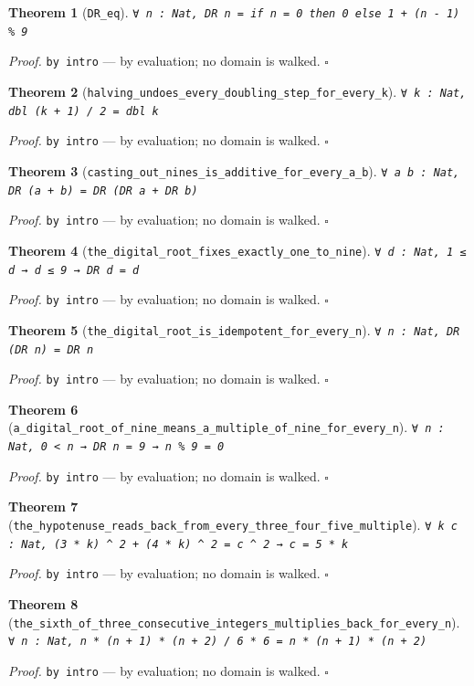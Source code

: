 \documentclass[11pt]{article}
\newtheorem{theorem}{Theorem}[section]
\begin{document}
\begin{theorem}[\texttt{DR\_eq}]
\texttt{∀ n : Nat, DR n = if n = 0 then 0 else 1 + (n - 1) \% 9}
\end{theorem}
\noindent\emph{Proof.} \texttt{by
  intro} --- by evaluation; no domain is walked. \hfill$\square$

\begin{theorem}[\texttt{halving\_undoes\_every\_doubling\_step\_for\_every\_k}]
\texttt{∀ k : Nat, dbl (k + 1) / 2 = dbl k}
\end{theorem}
\noindent\emph{Proof.} \texttt{by
  intro} --- by evaluation; no domain is walked. \hfill$\square$

\begin{theorem}[\texttt{casting\_out\_nines\_is\_additive\_for\_every\_a\_b}]
\texttt{∀ a b : Nat, DR (a + b) = DR (DR a + DR b)}
\end{theorem}
\noindent\emph{Proof.} \texttt{by
  intro} --- by evaluation; no domain is walked. \hfill$\square$

\begin{theorem}[\texttt{the\_digital\_root\_fixes\_exactly\_one\_to\_nine}]
\texttt{∀ d : Nat, 1 ≤ d → d ≤ 9 → DR d = d}
\end{theorem}
\noindent\emph{Proof.} \texttt{by
  intro} --- by evaluation; no domain is walked. \hfill$\square$

\begin{theorem}[\texttt{the\_digital\_root\_is\_idempotent\_for\_every\_n}]
\texttt{∀ n : Nat, DR (DR n) = DR n}
\end{theorem}
\noindent\emph{Proof.} \texttt{by
  intro} --- by evaluation; no domain is walked. \hfill$\square$

\begin{theorem}[\texttt{a\_digital\_root\_of\_nine\_means\_a\_multiple\_of\_nine\_for\_every\_n}]
\texttt{∀ n : Nat, 0 < n → DR n = 9 → n \% 9 = 0}
\end{theorem}
\noindent\emph{Proof.} \texttt{by
  intro} --- by evaluation; no domain is walked. \hfill$\square$

\begin{theorem}[\texttt{the\_hypotenuse\_reads\_back\_from\_every\_three\_four\_five\_multiple}]
\texttt{∀ k c : Nat, (3 * k) ^ 2 + (4 * k) ^ 2 = c ^ 2 → c = 5 * k}
\end{theorem}
\noindent\emph{Proof.} \texttt{by
  intro} --- by evaluation; no domain is walked. \hfill$\square$

\begin{theorem}[\texttt{the\_sixth\_of\_three\_consecutive\_integers\_multiplies\_back\_for\_every\_n}]
\texttt{∀ n : Nat, n * (n + 1) * (n + 2) / 6 * 6 = n * (n + 1) * (n + 2)}
\end{theorem}
\noindent\emph{Proof.} \texttt{by
  intro} --- by evaluation; no domain is walked. \hfill$\square$
\end{document}

